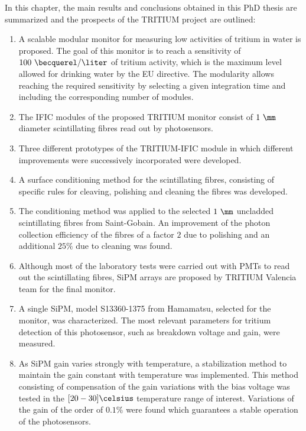 In this chapter, the main results and conclusions obtained in this PhD thesis are summarized and the prospects of the TRITIUM project are outlined:

\begin{enumerate}
\item{} A scalable modular monitor for measuring low activities of tritium in water is proposed. The goal of this monitor is to reach a sensitivity of $100~\becquerel/\liter$ of tritium activity, which is the maximum level allowed for drinking water by the EU directive. The modularity allows reaching the required sensitivity by selecting a given integration time and including the corresponding number of modules.

\item{} The IFIC modules of the proposed TRITIUM monitor consist of $1~\mm$ diameter scintillating fibres read out by photosensors.

\item{} Three different prototypes of the TRITIUM-IFIC module in which different improvements were successively incorporated were developed.

\item{} A surface conditioning method for the scintillating fibres, consisting of specific rules for cleaving, polishing and cleaning the fibres was developed.

\item{} The conditioning method was applied to the selected $1~\mm$ uncladded scintillating fibres from Saint-Gobain. An improvement of the photon collection efficiency of the fibres of a factor $2$ due to polishing and an additional $25\%$ due to cleaning was found.

\item{} Although most of the laboratory tests were carried out with PMTs to read out the scintillating fibres, SiPM arrays are proposed by TRITIUM Valencia team for the final monitor. 

\item{} A single SiPM, model S13360-1375 from Hamamatsu, selected for the monitor, was characterized. The most relevant parameters for tritium detection of this photosensor, such as breakdown voltage and gain, were measured.

\item{} As SiPM gain varies strongly with temperature, a stabilization method to maintain the gain constant with temperature was implemented. This method consisting of compensation of the gain variations with the bias voltage was tested in the $[20-30]\celsius$ temperature range of interest. Variations of the gain of the order of $0.1\%$ were found which guarantees a stable operation of the photosensors.


\end{enumerate}
